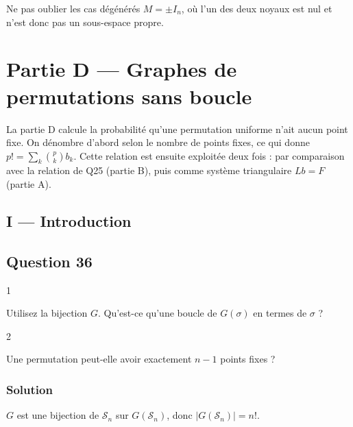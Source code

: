 \documentclass[11pt,a4paper]{article}
\begin{document}
\begin{piege}

Ne pas oublier les cas dégénérés \(M=\pm I_n\), où l'un des deux noyaux est nul et n'est donc pas un sous-espace propre.

\end{piege}

\hypertarget{partie-d-graphes-de-permutations-sans-boucle}{%
\section{Partie D --- Graphes de permutations sans boucle}\label{partie-d-graphes-de-permutations-sans-boucle}}

La partie D calcule la probabilité qu'une permutation uniforme n'ait aucun point fixe. On dénombre d'abord selon le nombre de points fixes, ce qui donne \(p!=\sum_k\binom pk b_k\). Cette relation est ensuite exploitée deux fois : par comparaison avec la relation de Q25 (partie B), puis comme système triangulaire \(Lb=F\) (partie A).

\hypertarget{i-introduction}{%
\subsection{I --- Introduction}\label{i-introduction}}

\hypertarget{question-36}{%
\subsection{Question 36}\label{question-36}}

\begin{indication}{1}

Utilisez la bijection \(G\). Qu'est-ce qu'une boucle de \(G(\sigma)\) en termes de \(\sigma\) ?

\end{indication}

\begin{indication}{2}

Une permutation peut-elle avoir exactement \(n-1\) points fixes ?

\end{indication}

\hypertarget{solution-35}{%
\subsubsection{Solution}\label{solution-35}}

\(G\) est une bijection de \(\mathcal S_n\) sur \(G(\mathcal S_n)\), donc \(\boxed{|G(\mathcal S_n)|=n!}\).
\end{document}
